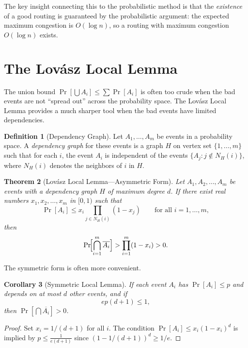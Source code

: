 \documentclass[twoside,12pt]{book}
\theoremstyle{plain}
\newtheorem{theorem}{Theorem}[chapter]
\newtheorem{corollary}[theorem]{Corollary}
\theoremstyle{definition}
\newtheorem{definition}[theorem]{Definition}
\theoremstyle{remark}
\begin{document}
The key insight connecting this to the probabilistic method is that the
\emph{existence} of a good routing is guaranteed by the probabilistic
argument: the expected maximum congestion is $O(\log n)$, so a routing
with maximum congestion $O(\log n)$ exists.

\section{The Lov\'{a}sz Local Lemma}
\label{sec:lll}

The union bound $\Pr[\bigcup A_i] \leq \sum \Pr[A_i]$ is often too crude
when the bad events are not ``spread out'' across the probability space.
The Lov\'{a}sz Local Lemma provides a much sharper tool when the bad
events have limited dependencies.

\begin{definition}[Dependency Graph]
Let $A_1, \ldots, A_m$ be events in a probability space. A
\emph{dependency graph} for these events is a graph $H$ on vertex set
$\{1, \ldots, m\}$ such that for each $i$, the event $A_i$ is independent
of the events $\{A_j : j \notin N_H(i)\}$, where $N_H(i)$ denotes the
neighbors of $i$ in $H$.
\end{definition}

\begin{theorem}[Lov\'{a}sz Local Lemma---Asymmetric Form]
\label{thm:lll}
Let $A_1, A_2, \ldots, A_m$ be events with a dependency graph $H$ of
maximum degree $d$. If there exist real numbers $x_1, x_2, \ldots, x_m$
in $[0, 1)$ such that
\[
\Pr[A_i] \leq x_i \prod_{j \in N_H(i)} (1 - x_j)
\qquad \text{for all } i = 1, \ldots, m,
\]
then
\[
\Pr\!\Bigl[\bigcap_{i=1}^{m} \overline{A_i}\Bigr]
> \prod_{i=1}^{m} (1 - x_i) > 0.
\]
\end{theorem}

The symmetric form is often more convenient.

\begin{corollary}[Symmetric Local Lemma]
\label{cor:lll-symmetric}
If each event $A_i$ has $\Pr[A_i] \leq p$ and depends on at most $d$
other events, and if
\[
ep(d + 1) \leq 1,
\]
then $\Pr[\bigcap \overline{A_i}] > 0$.
\end{corollary}

\begin{proof}
Set $x_i = 1/(d+1)$ for all $i$. The condition $\Pr[A_i] \leq
x_i(1 - x_i)^d$ is implied by $p \leq \frac{1}{e(d+1)}$ since
$(1 - 1/(d+1))^d \geq 1/e$.
\end{proof}
\end{document}

